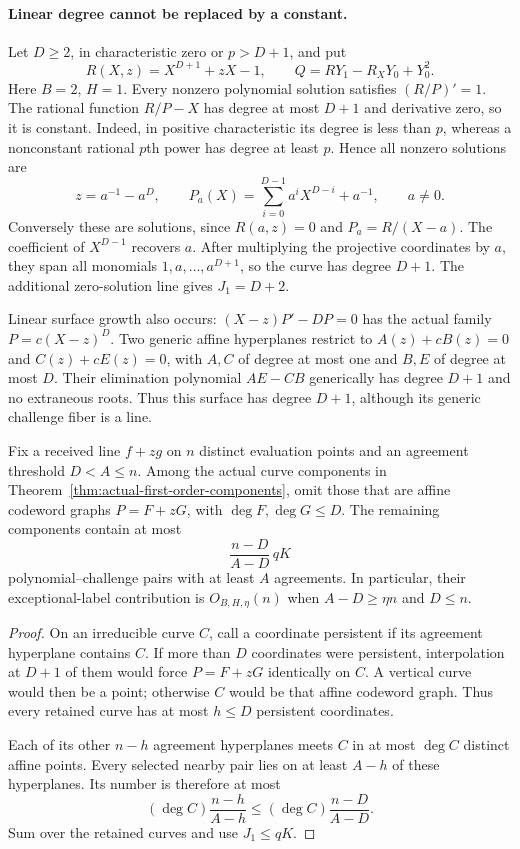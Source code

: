 \paragraph{Linear degree cannot be replaced by a constant.}
Let $D\ge2$, in characteristic zero or $p>D+1$, and put
\[
 R(X,z)=X^{D+1}+zX-1,\qquad
 Q=RY_1-R_XY_0+Y_0^2.
\]
Here $B=2$, $H=1$. Every nonzero polynomial solution satisfies
$(R/P)'=1$. The rational function $R/P-X$ has degree at most
$D+1$ and derivative zero, so it is constant. Indeed, in positive
characteristic its degree is less than $p$, whereas a nonconstant
rational $p$th power has degree at least $p$.
Hence all nonzero solutions are
\[
 z=a^{-1}-a^D,\qquad
 P_a(X)=\sum_{i=0}^{D-1}a^iX^{D-i}+a^{-1},\qquad a\ne0.
\]
Conversely these are solutions, since $R(a,z)=0$ and $P_a=R/(X-a)$.
The coefficient of $X^{D-1}$ recovers $a$. After multiplying the
projective coordinates by $a$, they span all monomials
$1,a,\ldots,a^{D+1}$, so the curve has degree $D+1$.
The additional zero-solution line gives $J_1=D+2$.

Linear surface growth also occurs: $(X-z)P'-DP=0$ has the actual
family $P=c(X-z)^D$. Two generic affine hyperplanes restrict to
$A(z)+cB(z)=0$ and $C(z)+cE(z)=0$, with $A,C$ of degree at most
one and $B,E$ of degree at most $D$. Their elimination polynomial
$AE-CB$ generically has degree $D+1$ and no extraneous roots.
Thus this surface has degree $D+1$, although its generic challenge
fiber is a line.

\begin{corollary}
\label{cor:nonaffine-actual-curves}
Fix a received line $f+zg$ on $n$ distinct evaluation points and an
agreement threshold $D<A\le n$. Among the actual curve components in
Theorem~\ref{thm:actual-first-order-components}, omit those that are
affine codeword graphs $P=F+zG$, with $\deg F,\deg G\le D$.
The remaining components contain at most
\[
 \frac{n-D}{A-D}\,qK
\]
polynomial--challenge pairs with at least $A$ agreements. In particular,
their exceptional-label contribution is $O_{B,H,\eta}(n)$ when
$A-D\ge\eta n$ and $D\le n$.
\end{corollary}
\begin{proof}
On an irreducible curve $C$, call a coordinate persistent if its
agreement hyperplane contains $C$. If more than $D$ coordinates were
persistent, interpolation at $D+1$ of them would force
$P=F+zG$ identically on $C$. A vertical curve would then be a point;
otherwise $C$ would be that affine codeword graph. Thus every retained
curve has at most $h\le D$ persistent coordinates.

Each of its other $n-h$ agreement hyperplanes meets $C$ in at most
$\deg C$ distinct affine points. Every selected nearby pair lies on
at least $A-h$ of these hyperplanes. Its number is therefore at most
\[
 (\deg C)\frac{n-h}{A-h}
 \le(\deg C)\frac{n-D}{A-D}.
\]
Sum over the retained curves and use $J_1\le qK$.
\end{proof}


